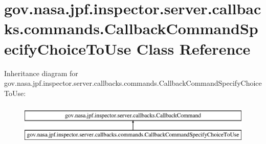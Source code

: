 \hypertarget{classgov_1_1nasa_1_1jpf_1_1inspector_1_1server_1_1callbacks_1_1commands_1_1_callback_command_specify_choice_to_use}{}\section{gov.\+nasa.\+jpf.\+inspector.\+server.\+callbacks.\+commands.\+Callback\+Command\+Specify\+Choice\+To\+Use Class Reference}
\label{classgov_1_1nasa_1_1jpf_1_1inspector_1_1server_1_1callbacks_1_1commands_1_1_callback_command_specify_choice_to_use}
Inheritance diagram for gov.\+nasa.\+jpf.\+inspector.\+server.\+callbacks.\+commands.\+Callback\+Command\+Specify\+Choice\+To\+Use\+:\begin{figure}[H]
\begin{center}
\leavevmode
\includegraphics[height=2.000000cm]{classgov_1_1nasa_1_1jpf_1_1inspector_1_1server_1_1callbacks_1_1commands_1_1_callback_command_specify_choice_to_use}
\end{center}
\end{figure}
